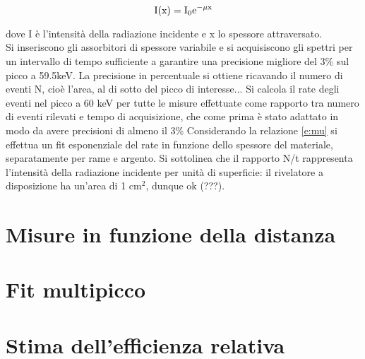 \documentclass[twocolumn,10pt]{asme2ej}
\begin{document}
\vspace{-15pt}
\begin{equation}
   \text{I}(\text{x)} = \text{I}_0 \text{e}^{-\mu \text{x}}
    \vspace{-5pt}
    \label{e:mu}
\end{equation}

dove I è l'intensità della radiazione incidente e x lo spessore attraversato. 
\\ Si inseriscono gli assorbitori di spessore variabile e si acquisiscono gli spettri per
un intervallo di tempo sufficiente a garantire una precisione migliore del 3\% sul picco a 59.5keV.
La precisione in percentuale si ottiene ricavando il numero di eventi N, cioè l'area, al di sotto del
picco di interesse...
Si calcola il rate degli eventi nel picco a 60 keV per tutte le misure effettuate come rapporto tra numero di 
eventi rilevati e tempo di acquisizione, che come prima è stato adattato in modo da avere precisioni di almeno il 3\%
Considerando la relazione \autoref{e:mu} si effettua un fit esponenziale del rate in funzione dello spessore del materiale, 
separatamente per rame e argento. Si sottolinea che il rapporto N/t rappresenta l'intensità della radiazione incidente
per unità di superficie: il rivelatore a disposizione ha un'area di 1 $\si{\centi\metre}^2$, dunque ok (???).




\section{Misure in funzione della distanza}\label{s:distanza}









\section{Fit multipicco}\label{s:multipicco}





\section{Stima dell'efficienza relativa}\label{s:efficienza}
\end{document}
